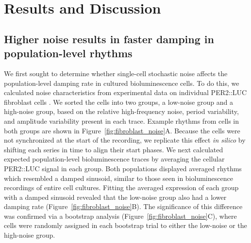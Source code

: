 \documentclass[11pt, letterpaper]{article}
\begin{document}
\section*{Results and Discussion}

\subsection*{Higher noise results in faster damping in population-level rhythms}

We first sought to determine whether single-cell stochastic noise affects the population-level damping rate in cultured bioluminescence cells.
To do this, we calculated noise characteristics from experimental data on individual PER2::LUC fibroblast cells \cite{Leise2012}.
We sorted the cells into two groups, a low-noise group and a high-noise group, based on the relative high-frequency noise, period variability, and amplitude variability present in each trace.
Example rhythms from cells in both groups are shown in Figure~\ref{fig:fibroblast_noise}A.
Because the cells were not synchronized at the start of the recording, we replicate this effect {\itshape in silico} by shifting each series in time to align their start phases.
We next calculated expected population-level bioluminescence traces by averaging the cellular PER2::LUC signal in each group.
Both populations displayed averaged rhythms which resembled a damped sinusoid, similar to those seen in bioluminescence recordings of entire cell cultures.
Fitting the averaged expression of each group with a damped sinusoid revealed that the low-noise group also had a lower damping rate (Figure~\ref{fig:fibroblast_noise}B).
The significance of this difference was confirmed via a bootstrap analysis (Figure~\ref{fig:fibroblast_noise}C), where cells were randomly assigned in each bootstrap trial to either the low-noise or the high-noise group.
\end{document}
